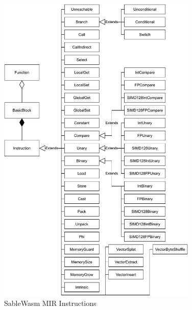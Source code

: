 \begin{figure}
  \centering
  \includegraphics[width=0.85\textwidth]{Images/4.MIR/sablewasm-instruction.pdf}
  \caption{SableWasm MIR Instructions}
  \label{fig:sablewasm-mir-inst}
\end{figure}

